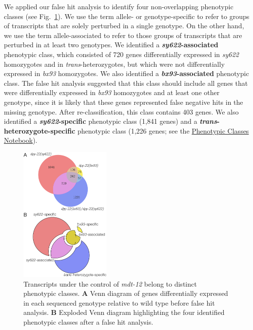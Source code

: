 \documentclass[10pt, twocolumn]{article}
\newcommand{\gene}[1]{\mbox{\emph{#1}}}
\newcommand{\dpy}{\gene{mdt-12}}
\begin{document}
We applied our false hit analysis to identify four non-overlapping phenotypic
classes (see Fig.~\ref{fig:venn}). We use the term allele- or genotype-specific
to refer to groups of transcripts that are solely perturbed in a single
genotype. On the other hand, we use the term allele-associated to refer to those
groups of transcripts that are perturbed in at least two genotypes. We
identified a \textbf{\emph{sy622}-associated} phenotypic class, which consisted of 720
genes differentially expressed in \emph{sy622} homozygotes and in
\emph{trans}-heterozygotes, but which were not differentially expressed in
\emph{bx93} homozygotes. We also identified a \textbf{\emph{bx93}-associated} phenotypic
class. The false hit analysis suggested that this class should include all
genes that were differentially expressed in \emph{bx93} homozygotes and at least
one other genotype, since it is likely that these genes represented false
negative hits in the missing genotype. After re-classification, this class
contains 403 genes. We also identified a \textbf{\emph{sy622}-specific} phenotypic class
(1,841 genes) and a \textbf{\emph{trans}-heterozygote-specific} phenotypic class (1,226
genes; see the
\href{https://wormlabcaltech.github.io/med-cafe/notebook/phenotypic_classes.html}{
Phenotypic Classes Notebook}).


\begin{figure}
  \includegraphics[width=0.4\textwidth]{../figs/venn_diagrams.pdf}
  \caption{
  Transcripts under the control of \dpy{} belong to distinct phenotypic
  classes.
  \textbf{A} Venn diagram of genes differentially expressed in each sequenced
  genotype relative to wild type before false hit analysis.
  \textbf{B} Exploded Venn diagram highlighting the four identified phenotypic
  classes after a false hit analysis.
  }
\label{fig:venn}
\end{figure}
\end{document}
